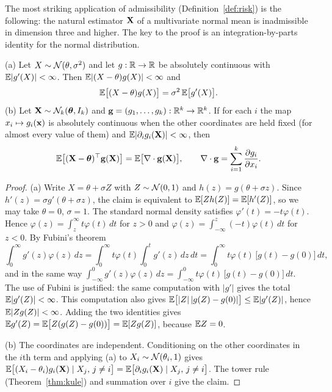 \documentclass[main.tex]{subfiles}
\begin{document}
The most striking application of admissibility (Definition~\ref{def:risk}) is the following: the natural estimator $\mathbf{X}$ of a multivariate normal mean is inadmissible in dimension three and higher. The key to the proof is an integration-by-parts identity for the normal distribution.

\begin{lemma}\label{lem:stein}
(a) Let $X\sim\mathcal{N}(\theta,\sigma^2)$ and let $g:\mathbb{R}\to\mathbb{R}$ be absolutely continuous with $\mathbb{E}|g'(X)|<\infty$. Then $\mathbb{E}|(X-\theta)g(X)|<\infty$ and
\[
\mathbb{E}\big[(X-\theta)g(X)\big]=\sigma^2\,\mathbb{E}\big[g'(X)\big].
\]
(b) Let $\mathbf{X}\sim\mathcal{N}_k(\bm\theta,I_k)$ and $\mathbf g=(g_1,\dots,g_k):\mathbb{R}^k\to\mathbb{R}^k$. If for each $i$ the map $x_i\mapsto g_i(\mathbf{x})$ is absolutely continuous when the other coordinates are held fixed (for almost every value of them) and $\mathbb{E}|\partial_ig_i(\mathbf{X})|<\infty$, then
\[
\mathbb{E}\big[(\mathbf{X}-\bm\theta)^\top\mathbf g(\mathbf{X})\big]=\mathbb{E}\big[\nabla\cdot\mathbf g(\mathbf{X})\big],\qquad \nabla\cdot\mathbf g=\sum_{i=1}^k\frac{\partial g_i}{\partial x_i}.
\]
\end{lemma}
\begin{proof}
(a) Write $X=\theta+\sigma Z$ with $Z\sim\mathcal{N}(0,1)$ and $h(z)=g(\theta+\sigma z)$. Since $h'(z)=\sigma g'(\theta+\sigma z)$, the claim is equivalent to $\mathbb{E}[Zh(Z)]=\mathbb{E}[h'(Z)]$, so we may take $\theta=0$, $\sigma=1$. The standard normal density satisfies $\varphi'(t)=-t\varphi(t)$. Hence $\varphi(z)=\int_z^\infty t\varphi(t)\,dt$ for $z>0$ and $\varphi(z)=\int_{-\infty}^z(-t)\varphi(t)\,dt$ for $z<0$. By Fubini's theorem
\[
\int_0^\infty g'(z)\varphi(z)\,dz=\int_0^\infty t\varphi(t)\int_0^tg'(z)\,dz\,dt=\int_0^\infty t\varphi(t)\,\big[g(t)-g(0)\big]\,dt,
\]
and in the same way $\int_{-\infty}^0g'(z)\varphi(z)\,dz=\int_{-\infty}^0t\varphi(t)\,\big[g(t)-g(0)\big]\,dt$. The use of Fubini is justified: the same computation with $|g'|$ gives the total $\mathbb{E}|g'(Z)|<\infty$. This computation also gives $\mathbb{E}\big[|Z|\,|g(Z)-g(0)|\big]\le\mathbb{E}|g'(Z)|$, hence $\mathbb{E}|Zg(Z)|<\infty$. Adding the two identities gives $\mathbb{E} g'(Z)=\mathbb{E}\big[Z(g(Z)-g(0))\big]=\mathbb{E}[Zg(Z)]$, because $\mathbb{E} Z=0$.

(b) The coordinates are independent. Conditioning on the other coordinates in the $i$th term and applying (a) to $X_i\sim\mathcal{N}(\theta_i,1)$ gives
$\mathbb{E}\big[(X_i-\theta_i)g_i(\mathbf{X})\mid X_j,\,j\ne i\big]=\mathbb{E}\big[\partial_ig_i(\mathbf{X})\mid X_j,\,j\ne i\big]$. The tower rule (Theorem~\ref{thm:kule}) and summation over $i$ give the claim.
\end{proof}
\end{document}
